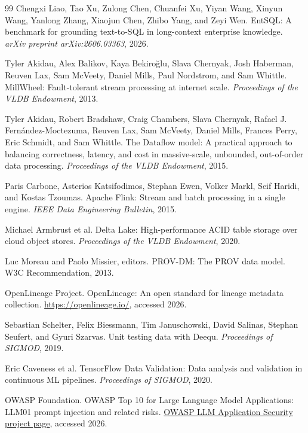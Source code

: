 \documentclass[sigconf,nonacm]{acmart}
\begin{document}
\begin{thebibliography}{99}
Chengxi Liao, Tao Xu, Zulong Chen, Chuanfei Xu, Yiyan Wang, Xinyun Wang, Yanlong Zhang, Xiaojun Chen, Zhibo Yang, and Zeyi Wen.
\newblock EntSQL: A benchmark for grounding text-to-SQL in long-context enterprise knowledge.
\newblock \emph{arXiv preprint arXiv:2606.03363}, 2026.

Tyler Akidau, Alex Balikov, Kaya Bekiro\u{g}lu, Slava Chernyak, Josh Haberman, Reuven Lax, Sam McVeety, Daniel Mills, Paul Nordstrom, and Sam Whittle.
\newblock MillWheel: Fault-tolerant stream processing at internet scale.
\newblock \emph{Proceedings of the VLDB Endowment}, 2013.

Tyler Akidau, Robert Bradshaw, Craig Chambers, Slava Chernyak, Rafael J. Fern\'andez-Moctezuma, Reuven Lax, Sam McVeety, Daniel Mills, Frances Perry, Eric Schmidt, and Sam Whittle.
\newblock The Dataflow model: A practical approach to balancing correctness, latency, and cost in massive-scale, unbounded, out-of-order data processing.
\newblock \emph{Proceedings of the VLDB Endowment}, 2015.

Paris Carbone, Asterios Katsifodimos, Stephan Ewen, Volker Markl, Seif Haridi, and Kostas Tzoumas.
\newblock Apache Flink: Stream and batch processing in a single engine.
\newblock \emph{IEEE Data Engineering Bulletin}, 2015.

Michael Armbrust et al.
\newblock Delta Lake: High-performance ACID table storage over cloud object stores.
\newblock \emph{Proceedings of the VLDB Endowment}, 2020.

Luc Moreau and Paolo Missier, editors.
\newblock PROV-DM: The PROV data model.
\newblock W3C Recommendation, 2013.

OpenLineage Project.
\newblock OpenLineage: An open standard for lineage metadata collection.
\newblock \url{https://openlineage.io/}, accessed 2026.

Sebastian Schelter, Felix Biessmann, Tim Januschowski, David Salinas, Stephan Seufert, and Gyuri Szarvas.
\newblock Unit testing data with Deequ.
\newblock \emph{Proceedings of SIGMOD}, 2019.

Eric Caveness et al.
\newblock TensorFlow Data Validation: Data analysis and validation in continuous ML pipelines.
\newblock \emph{Proceedings of SIGMOD}, 2020.

OWASP Foundation.
\newblock OWASP Top 10 for Large Language Model Applications: LLM01 prompt injection and related risks.
\newblock \href{https://owasp.org/www-project-top-10-for-large-language-model-applications/}{OWASP LLM Application Security project page}, accessed 2026.


\end{thebibliography}
\end{document}
